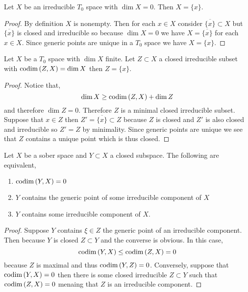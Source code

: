 \documentclass[12pt]{article}
\begin{document}
\begin{prop}
Let $X$ be an irreducible $T_0$ space with $\dim{X} = 0$. Then $X = \{  x \}$.  
\end{prop}

\begin{proof}
By definition $X$ is nonempty. Then for each $x \in X$ consider $\overline{ \{ x \} } \subset X$ but $\overline{ \{ x \} }$ is closed and irreducible so because $\dim{X} = 0$ we have $X = \overline{ \{ x \} }$ for each $x \in X$. Since generic points are unique in a $T_0$ space we have $X = \{ x \}$.
\end{proof}

\begin{prop}
Let $X$ be a $T_0$ space with $\dim{X}$ finite. Let $Z \subset X$ a closed irreducible subset with $\mathrm{codim}\left( Z, X \right) = \dim{X}$ then $Z = \{ x \}$. 
\end{prop}

\begin{proof}
Notice that,
\[ \dim{X} \ge \mathrm{codim}\left( Z,X \right) + \dim{Z} \]
and therefore $\dim{Z} = 0$. Therefore $Z$ is a minimal closed irreducible subset. Suppose that $x \in Z$ then $Z' = \overline{ \{ x \} } \subset Z$ because $Z$ is closed and $Z'$ is also closed and irreducible so $Z' = Z$ by minimality. Since generic points are unique we see that $Z$ contains a unique point which is thus closed. 
\end{proof}

\begin{lemma}
Let $X$ be a sober space and $Y \subset X$ a closed subspace. The following are equivalent,
\begin{enumerate}
\item $\mathrm{codim}\left( Y, X \right) = 0$
\item $Y$ contains the generic point of some irreducible component of $X$
\item $Y$ contains some irreducible component of $X$.
\end{enumerate}
\end{lemma}

\begin{proof}
Suppose $Y$ contains $\xi \in Z$ the generic point of an irreducible component. Then because $Y$ is closed $Z \subset Y$ and the converse is obvious. In this case,
\[ \mathrm{codim}\left( Y, X \right) \le \mathrm{codim}\left( Z, X \right) = 0 \]
because $Z$ is maximal and thus $\mathrm{codim}\left( Y, Z \right) = 0$. Conversely, suppose that $\mathrm{codim}\left( Y, X \right) = 0$ then there is some closed irreducible $Z \subset Y$ such that $\mathrm{codim}\left( Z,X \right) = 0$ menaing that $Z$ is an irreducible component. 
\end{proof}
\end{document}
